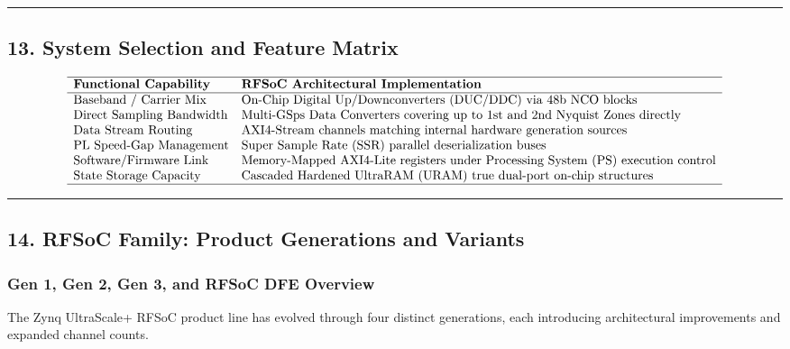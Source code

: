 \documentclass[
]{article}
\begin{document}
\begin{center}\rule{0.5\linewidth}{0.5pt}\end{center}

\subsection{13. System Selection and Feature
Matrix}\label{system-selection-and-feature-matrix}

\[\begin{array}{ll}
\hline
\textbf{Functional Capability} & \textbf{RFSoC Architectural Implementation} \\ \hline
\text{Baseband / Carrier Mix} & \text{On-Chip Digital Up/Downconverters (DUC/DDC) via 48b NCO blocks} \\
\text{Direct Sampling Bandwidth} & \text{Multi-GSps Data Converters covering up to 1st and 2nd Nyquist Zones directly} \\
\text{Data Stream Routing} & \text{AXI4-Stream channels matching internal hardware generation sources} \\
\text{PL Speed-Gap Management} & \text{Super Sample Rate (SSR) parallel deserialization buses} \\
\text{Software/Firmware Link} & \text{Memory-Mapped AXI4-Lite registers under Processing System (PS) execution control} \\
\text{State Storage Capacity} & \text{Cascaded Hardened UltraRAM (URAM) true dual-port on-chip structures} \\ \hline
\end{array}\]

\begin{center}\rule{0.5\linewidth}{0.5pt}\end{center}

\subsection{14. RFSoC Family: Product Generations and
Variants}\label{rfsoc-family-product-generations-and-variants}

\subsubsection{Gen 1, Gen 2, Gen 3, and RFSoC DFE
Overview}\label{gen-1-gen-2-gen-3-and-rfsoc-dfe-overview}

The Zynq UltraScale+ RFSoC product line has evolved through four
distinct generations, each introducing architectural improvements and
expanded channel counts.
\end{document}
